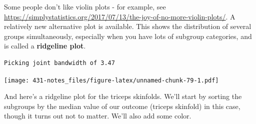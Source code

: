 \documentclass[
]{book}
\newenvironment{Shaded}{\begin{snugshade}}{\end{snugshade}}
\newcommand{\DataTypeTok}[1]{\textcolor[rgb]{0.13,0.29,0.53}{#1}}
\newcommand{\FloatTok}[1]{\textcolor[rgb]{0.00,0.00,0.81}{#1}}
\newcommand{\KeywordTok}[1]{\textcolor[rgb]{0.13,0.29,0.53}{\textbf{#1}}}
\newcommand{\NormalTok}[1]{#1}
\newcommand{\OperatorTok}[1]{\textcolor[rgb]{0.81,0.36,0.00}{\textbf{#1}}}
\newcommand{\StringTok}[1]{\textcolor[rgb]{0.31,0.60,0.02}{#1}}
\begin{document}
Some people don't like violin plots - for example, see \url{https://simplystatistics.org/2017/07/13/the-joy-of-no-more-violin-plots/}. A relatively new alternative plot is available. This shows the distribution of several groups simultaneously, especially when you have lots of subgroup categories, and is called a \textbf{ridgeline plot}.

\begin{Shaded}
\end{Shaded}

\begin{verbatim}
Picking joint bandwidth of 3.47
\end{verbatim}

\texttt{[image: 431-notes\_files/figure-latex/unnamed-chunk-79-1.pdf]}

And here's a ridgeline plot for the triceps skinfolds. We'll start by sorting the subgroups by the median value of our outcome (triceps skinfold) in this case, though it turns out not to matter. We'll also add some color.
\end{document}
